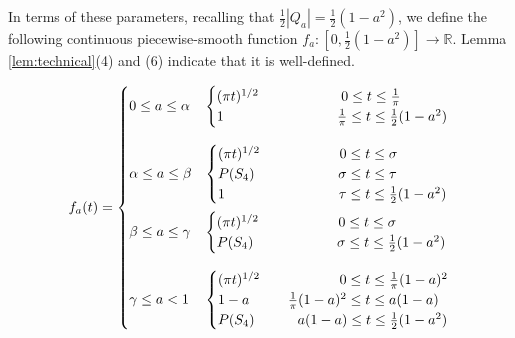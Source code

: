 \documentclass[leqno]{article}
\numberwithin{equation}{section}
\theoremstyle{definition}
\theoremstyle{remark}
\theoremstyle{plain}
\begin{document}
In terms of these parameters, recalling that $\frac{1}{2}|Q_a| = \frac{1}{2}(1-a^2)$, we define the following continuous piecewise-smooth function $f_a:\left[0, \frac{1}{2}(1-a^2)\right]\rightarrow \mathbb{R}$.  Lemma \ref{lem:technical}(4) and (6) indicate that it is well-defined.

\begin{equation}\label{eq:profile}
       f_a(t)= \begin{cases}
            0 \leq a \leq \alpha & \begin{cases}
                (\pi t)^{1/2} & \hspace{4.9em}0\leq t \leq \frac{1}{\pi} \\
                1 & \hspace{4.6em}\frac{1}{\pi} \leq t \leq \frac{1}{2}(1-a^2)
            \end{cases} \\[2em]
            \alpha \leq a \leq \beta & \begin{cases}
                (\pi t)^{1/2} & \hspace{4.7em}0\leq t \leq \sigma \\
                P(S_4) & \hspace{4.6em}\sigma \leq t \leq \tau \\
                1 & \hspace{4.65em}\tau \leq t \leq \frac{1}{2}(1-a^2)
            \end{cases} \\[2em]
            \beta \leq a \leq \gamma & \begin{cases}
                (\pi t)^{1/2} & \hspace{4.7em}0\leq t \leq \sigma \\
                P(S_4) & \hspace{4.6em}\sigma \leq t \leq \frac{1}{2}(1-a^2) \\
            \end{cases} \\[2em]
            \gamma \leq a < 1 & \begin{cases}
                (\pi t)^{1/2} & \hspace{4.7em} 0\leq t \leq \frac{1}{\pi}(1-a)^2 \\
                1-a & \hspace{1em}\frac{1}{\pi}(1-a)^2 \leq t \leq a(1-a) \\
                P(S_4) & \hspace{1.7em}a(1-a) \leq t \leq \frac{1}{2}(1-a^2)
            \end{cases}
        \end{cases}
\end{equation}
\end{document}
